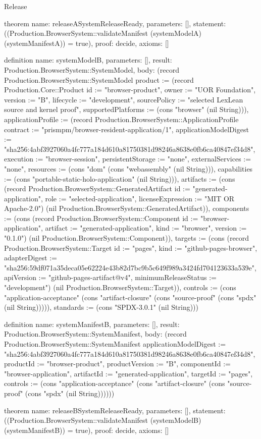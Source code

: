 \begin{lexlean}{Release}
\begin{semanticmodule}
theorem{
  name: releaseASystemReleaseReady,
  parameters: [],
  statement: ((Production.BrowserSystem::validateManifest (systemModelA) (systemManifestA)) = true),
  proof: decide{},
  axioms: []
}

definition{
  name: systemModelB,
  parameters: [],
  result: Production.BrowserSystem::SystemModel,
  body: (record Production.BrowserSystem::SystemModel {product := (record Production.Core::Product {id := "browser-product", owner := "UOR Foundation", version := "B", lifecycle := "development", sourcePolicy := "selected LexLean source and kernel proof", supportedPlatforms := (cons "browser" (nil String))}), applicationProfile := (record Production.BrowserSystem::ApplicationProfile {contract := "prismpm/browser-resident-application/1", applicationModelDigest := "sha256:4abf3927060a4fc777a184d610a81750381d98246a8638e0fb6ca40847ef34d8", execution := "browser-session", persistentStorage := "none", externalServices := "none", resources := (cons "dom" (cons "webassembly" (nil String))), capabilities := (cons "portable-static-holo-application" (nil String))}), artifacts := (cons (record Production.BrowserSystem::GeneratedArtifact {id := "generated-application", role := "selected-application", licenseExpression := "MIT OR Apache-2.0"}) (nil Production.BrowserSystem::GeneratedArtifact)), components := (cons (record Production.BrowserSystem::Component {id := "browser-application", artifact := "generated-application", kind := "browser", version := "0.1.0"}) (nil Production.BrowserSystem::Component)), targets := (cons (record Production.BrowserSystem::Target {id := "pages", kind := "github-pages-browser", adapterDigest := "sha256:59df071a35deca05e62224e43b82d7bc9b5c649f989a3424fd704123633a539e", apiVersion := "github-pages-artifact@v4", minimumReleaseStatus := "development"}) (nil Production.BrowserSystem::Target)), controls := (cons "application-acceptance" (cons "artifact-closure" (cons "source-proof" (cons "spdx" (nil String))))), standards := (cons "SPDX-3.0.1" (nil String))})
}

definition{
  name: systemManifestB,
  parameters: [],
  result: Production.BrowserSystem::SystemManifest,
  body: (record Production.BrowserSystem::SystemManifest {applicationModelDigest := "sha256:4abf3927060a4fc777a184d610a81750381d98246a8638e0fb6ca40847ef34d8", productId := "browser-product", productVersion := "B", componentId := "browser-application", artifactId := "generated-application", targetId := "pages", controls := (cons "application-acceptance" (cons "artifact-closure" (cons "source-proof" (cons "spdx" (nil String)))))})
}

theorem{
  name: releaseBSystemReleaseReady,
  parameters: [],
  statement: ((Production.BrowserSystem::validateManifest (systemModelB) (systemManifestB)) = true),
  proof: decide{},
  axioms: []
}
\end{semanticmodule}
\end{lexlean}
